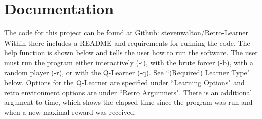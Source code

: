 \section{Documentation}
\label{sec:doc}
The code for this project can be found at 
\href{https://github.com/stevenwalton/Retro-Learner}{Github: stevenwalton/Retro-Learner}
Within there includes a README and requirements for running the code. The help
function is shown below and tells the user how to run the software. The user
must run the program either interactively (-i), with the brute forcer (-b),
with a random player (-r), or with the Q-Learner (-q). See ``(Required) Learner 
Type" below. Options for the Q-Learner are specified under 
``Learning Options" and retro environment options are under ``Retro Argumnets".
There is an additional argument to time, which shows the elapsed time since
the program was run and when a new maximal reward was received. 

